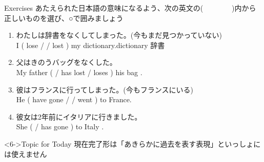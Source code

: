 \documentclass[aspectratio=169,xcolor={dvipsnames,table}]{beamer}
\newcommand{\myaudio}[1]{\href{#1}{\faVolumeUp}}
\begin{document}
\begin{frame}[plain]{Exercises}
 あたえられた日本語の意味になるよう、次の英文の(~~~~~~~~)内から正しいものを選び、○で囲みましょう%
\mbox{}\hfill{\scriptsize \myaudio{./audio/014_have_pp_kekka_05.mp3}}


\begin{enumerate}
 \item {\small わたしは辞書をなくしてしまった。}{\footnotesize (今もまだ見つかっていない)}\\
I  ( lose /  / lost ) my dictionary.\hfill{\scriptsize dictionary  辞書}
 \item {\small 父はきのうバッグをなくした。\textdbend}\\
My father (  / has lost / loses ) his bag .
 \item {\small 彼はフランスに行ってしまった。}{\footnotesize (今もフランスにいる)}\\
He ( have gone /  / went  ) to France.
 \item {\small 彼女は2年前にイタリアに行きました。\textdbend}\\
She (  / has gone ) to Italy .
\end{enumerate}

\begin{block}<6->{Topic for Today}\small
 現在完了形は「あきらかに過去を表す表現」といっしょには使えません\textdbend
\end{block}
\end{frame}
\end{document}
